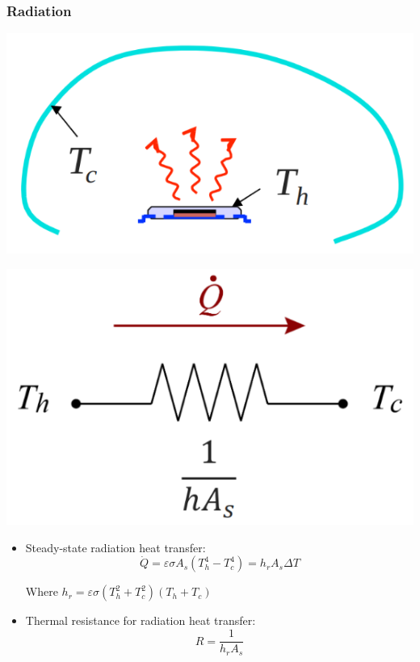 \documentclass[11pt]{article}
\begin{document}
\subsubsection{Radiation}
\label{sec:org02e9790}
\begin{center}
\includegraphics[scale=1]{./images/thermal-resistance-radiation.png}
\end{center}
\begin{center}
\includegraphics[scale=1]{./images/thermal-resistance-radiation-electrical-analogy.png}
\end{center}
\begin{itemize}
\item Steady-state radiation heat transfer:
\[\dot{Q} = \varepsilon \sigma A_s (T_h^4 - T_c^4) = h_r A_s \Delta T\]

Where \(h_r = \varepsilon \sigma (T_h^2 + T_c^2)(T_h + T_c)\)
\item Thermal resistance for radiation heat transfer:
\[R = \frac{1}{h_r A_s}\]
\end{itemize}
\end{document}

